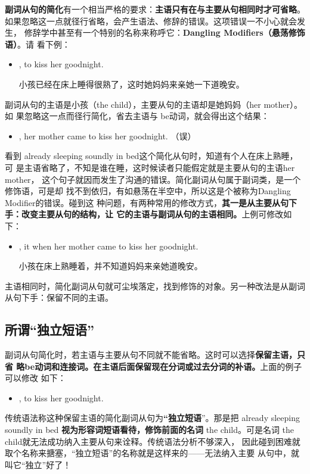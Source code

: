 \textbf{副词从句的简化}有一个相当严格的要求：\textbf{主语只有在与主要从句相同时才可省略}。
如果忽略这一点就径行省略，会产生语法、修辞的错误。这项错误一不小心就会发生，
修辞学中甚至有一个特别的名称来称呼它：\textbf{Dangling Modifiers（悬荡修饰语）}。请
看下例：
\begin{itemize}
\item {},   to kiss her goodnight.

  小孩已经在床上睡得很熟了，这时她妈妈来亲她一下道晚安。
\end{itemize}
副词从句的主语是小孩（the child），主要从句的主语却是她妈妈（her mother）。如
果忽略这一点而径行简化，省去主语与 be动词，就会得出这个结果：
\begin{itemize}
\item {}, her mother
  came to kiss her goodnight. （误）
\end{itemize}
看到 already sleeping soundly in bed这个简化从句时，知道有个人在床上熟睡，可
是主语省略了，不知是谁在睡，这时候读者只能假定就是主要从句的主语her mother，
这个句子就因而发生了沟通的错误。简化副词从句属于副词类，是一个修饰语，可是却
找不到依归，有如悬荡在半空中，所以这是个被称为Dangling Modifier的错误。碰到这
种问题，有两种常用的修改方式，\textbf{其一是从主要从句下手：改变主要从句的结构，让
  它的主语与副词从句的主语相同。}上例可修改如下：
\begin{itemize}
\item {}, 
   it when her mother came to kiss her goodnight.

  小孩在床上熟睡着，并不知道妈妈来亲她道晚安。
\end{itemize}

主语相同时，简化副词从句就可尘埃落定，找到修饰的对象。另一种改法是从副词从句下手：保留不同的主语。

\subsection{所谓“独立短语”}

副词从句简化时，若主语与主要从句不同就不能省略。这时可以选择\textbf{保留主语，只省
略be动词和连接词。在主语后面保留现在分词或过去分词的补语。}上面的例子可以修改
如下：
\begin{itemize}
\item {},   to kiss her goodnight.
\end{itemize}
传统语法称这种保留主语的简化副词从句为\textbf{“独立短语}”。那是把 already
sleeping soundly in bed \textbf{视为形容词短语看待，修饰前面的名词} the
child。可是名词 the child就无法成功纳入主要从句来诠释。传统语法分析不够深入，
因此碰到困难就取个名称来搪塞，“独立短语”的名称就是这样来的——无法纳入主要
从句中，就叫它“独立”好了！

